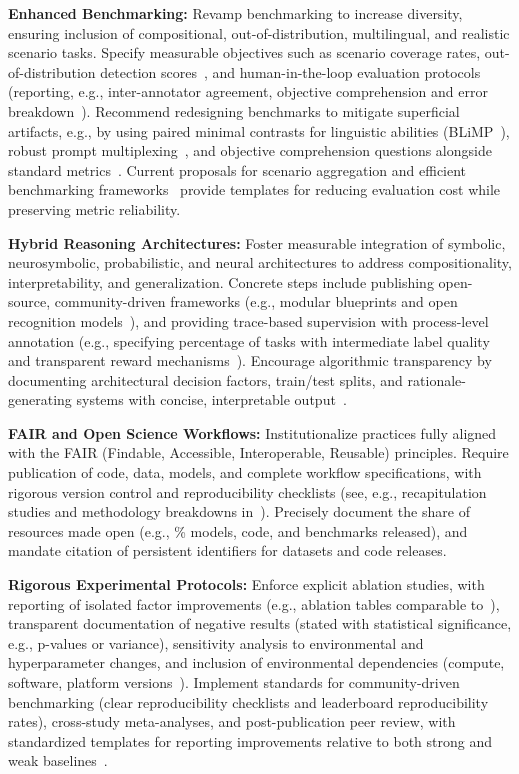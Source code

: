\documentclass[sigconf]{acmart}
\begin{document}
\textbf{Enhanced Benchmarking:}
Revamp benchmarking to increase diversity, ensuring inclusion of compositional, out-of-distribution, multilingual, and realistic scenario tasks. Specify measurable objectives such as scenario coverage rates, out-of-distribution detection scores~\cite{ref78}, and human-in-the-loop evaluation protocols (reporting, e.g., inter-annotator agreement, objective comprehension and error breakdown~\cite{ref81}). Recommend redesigning benchmarks to mitigate superficial artifacts, e.g., by using paired minimal contrasts for linguistic abilities (BLiMP~\cite{ref99}), robust prompt multiplexing~\cite{ref98}, and objective comprehension questions alongside standard metrics~\cite{ref81}. Current proposals for scenario aggregation and efficient benchmarking frameworks~\cite{ref101,ref104,ref105} provide templates for reducing evaluation cost while preserving metric reliability.

\textbf{Hybrid Reasoning Architectures:}
Foster measurable integration of symbolic, neurosymbolic, probabilistic, and neural architectures to address compositionality, interpretability, and generalization. Concrete steps include publishing open-source, community-driven frameworks (e.g., modular blueprints and open recognition models~\cite{ref12,ref92}), and providing trace-based supervision with process-level annotation (e.g., specifying percentage of tasks with intermediate label quality and transparent reward mechanisms~\cite{ref54,ref87}). Encourage algorithmic transparency by documenting architectural decision factors, train/test splits, and rationale-generating systems with concise, interpretable output~\cite{ref93}.

\textbf{FAIR and Open Science Workflows:}
Institutionalize practices fully aligned with the FAIR (Findable, Accessible, Interoperable, Reusable) principles. Require publication of code, data, models, and complete workflow specifications, with rigorous version control and reproducibility checklists (see, e.g., recapitulation studies and methodology breakdowns in~\cite{ref22,ref66,ref67}). Precisely document the share of resources made open (e.g., \% models, code, and benchmarks released), and mandate citation of persistent identifiers for datasets and code releases.

\textbf{Rigorous Experimental Protocols:}
Enforce explicit ablation studies, with reporting of isolated factor improvements (e.g., ablation tables comparable to~\cite{ref9,ref55}), transparent documentation of negative results (stated with statistical significance, e.g., p-values or variance), sensitivity analysis to environmental and hyperparameter changes, and inclusion of environmental dependencies (compute, software, platform versions~\cite{ref59,ref65}). Implement standards for community-driven benchmarking (clear reproducibility checklists and leaderboard reproducibility rates), cross-study meta-analyses, and post-publication peer review, with standardized templates for reporting improvements relative to both strong and weak baselines~\cite{ref61}.
\end{document}
